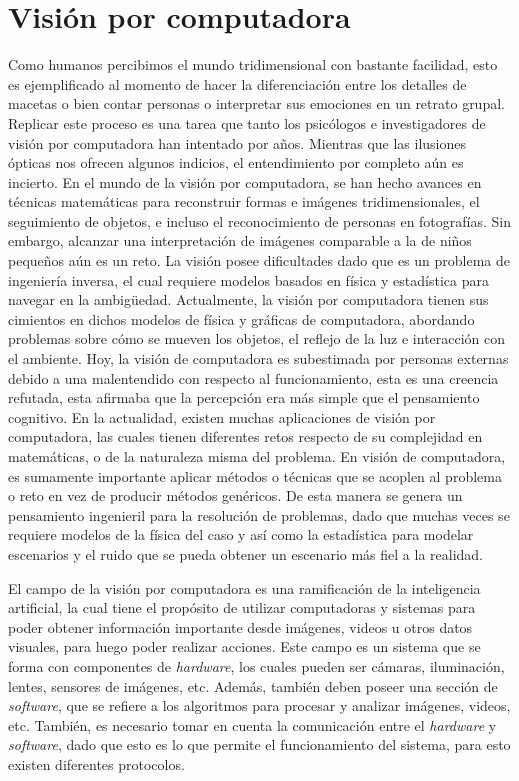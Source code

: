 \section*{Visión por computadora}

Como humanos percibimos el mundo tridimensional con bastante facilidad, esto es ejemplificado al momento de hacer la diferenciación entre los detalles de macetas o bien contar personas o interpretar sus emociones en un retrato grupal. Replicar este proceso es una tarea que tanto los psicólogos e investigadores de visión por computadora han intentado por años. Mientras que las ilusiones ópticas nos ofrecen algunos indicios, el entendimiento por completo aún es incierto. En el mundo de la visión por computadora, se han hecho avances en técnicas matemáticas para reconstruir formas e imágenes tridimensionales, el seguimiento de objetos, e incluso el reconocimiento de personas en fotografías. Sin embargo, alcanzar una interpretación de imágenes comparable a la de niños pequeños aún es un reto. La visión posee dificultades dado que es un problema de ingeniería inversa, el cual requiere modelos basados en física y estadística para navegar en la ambigüedad. Actualmente, la visión por computadora tienen sus cimientos en dichos modelos de física y gráficas de computadora, abordando problemas sobre cómo se mueven los objetos, el reflejo de la luz e interacción con el ambiente. Hoy, la visión de computadora es subestimada por personas externas debido a una malentendido con respecto al funcionamiento, esta es una creencia refutada, esta afirmaba que la percepción era más simple que el pensamiento cognitivo. En la actualidad,  existen muchas aplicaciones de visión por computadora, las cuales tienen diferentes retos respecto de su complejidad en matemáticas, o de la naturaleza misma del problema. En visión de computadora, es sumamente importante aplicar métodos o técnicas que se acoplen al problema o reto en vez de producir métodos genéricos. De esta manera se genera un pensamiento ingenieril para la resolución de problemas, dado que muchas veces se requiere modelos de la física del caso y así como la estadística para modelar escenarios y el ruido que se pueda obtener un escenario más fiel a la realidad. \cite{Szeliski_2023}

El campo de la visión por computadora es una ramificación de la inteligencia artificial, la cual tiene el propósito de utilizar computadoras y sistemas para poder obtener información importante desde imágenes, videos u otros datos visuales, para luego poder realizar acciones. Este campo es un sistema que se forma con componentes de \textit{hardware}, los cuales pueden ser cámaras, iluminación, lentes, sensores de imágenes, etc. Además, también deben poseer una sección de \textit{software}, que se refiere a los algoritmos para procesar y analizar imágenes, videos, etc. También, es necesario tomar en cuenta la comunicación entre el \textit{hardware} y \textit{software}, dado que esto es lo que permite el funcionamiento del sistema, para esto existen diferentes protocolos. \cite{IBM}


